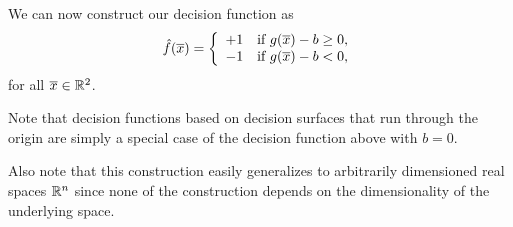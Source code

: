 \documentclass[a4paper,blends,pdf,colorBG,slideColor]{prosper}
\begin{document}
We can now construct our decision function as
 \begin{equation*}
\hat{f}(\overline{x}) = \left\{
\begin{array}{ll}
+1 & \mbox{if $g(\overline{x}) -b \ge 0$,}\\
-1 & \mbox{if $g(\overline{x})-b < 0$,}
\end{array}
\right.
\end{equation*}
for all $\overline{x}\in \mathbb{R}^{2}$.

Note that decision functions based on decision surfaces that run through the origin are simply
a special case of the decision function above with $b=0$.

Also note that this construction easily generalizes to arbitrarily dimensioned real spaces $\mathbb{R}^{n}$
since none of the construction depends on the dimensionality of the underlying space.
\es
\end{document}
